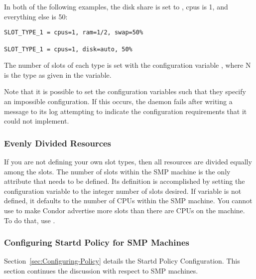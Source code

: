 In both of the following examples, the disk share is set to ,
cpus is 1, and everything else is 50\Percent:

\begin{verbatim}
SLOT_TYPE_1 = cpus=1, ram=1/2, swap=50%

SLOT_TYPE_1 = cpus=1, disk=auto, 50%
\end{verbatim}


The number of slots of each type is set with the
configuration variable
,
where N is the type as given in the
variable.

Note that it is possible to set the configuration variables such
that they specify an impossible configuration.
If this occurs, the  daemon fails after writing
a message to its log attempting to indicate the configuration
requirements that it could not implement.

\subsubsection{\label{sec:Config-Slot-Number}
Evenly Divided Resources}

If you are not defining your own slot types, then all resources
are divided equally among the slots.
The number of slots within the SMP machine is the only attribute
that needs to be defined.
Its definition is accomplished by setting the configuration
variable  to the
integer number of slots desired.
If variable  is not defined,
it defaults to the number of CPUs within the SMP machine.
You cannot use  to make Condor advertise more
slots than there are CPUs on the machine.
To do that, use .

\subsubsection{\label{sec:Config-SMP-Policy}
Configuring Startd Policy for SMP Machines}

Section~\ref{sec:Configuring-Policy} details the Startd
Policy Configuration.
This section continues the discussion with respect to SMP machines.

